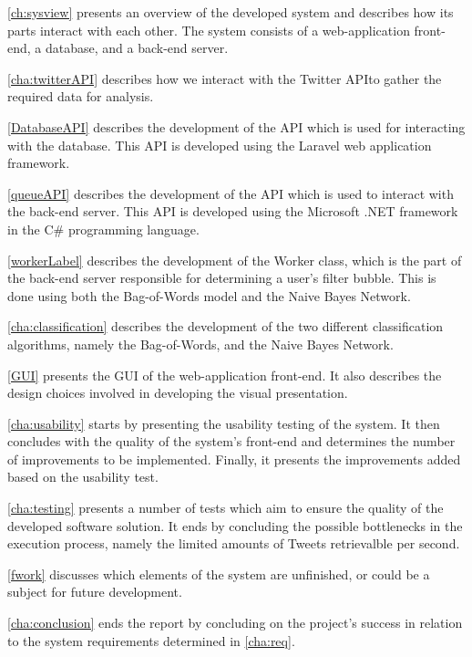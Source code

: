\autoref{ch:sysview} presents an overview of the developed system and describes
how its parts interact with each other. The system consists of a web-application
front-end, a database, and a back-end server.\nl

\autoref{cha:twitterAPI} describes how we interact with the Twitter \ac{API}to
gather the required data for analysis.\nl

\autoref{DatabaseAPI} describes the development of the \ac{API} which is used
for interacting with the database. This \ac{API} is developed using the Laravel
web application framework.\nl

\autoref{queueAPI} describes the development of the \ac{API} which is used to
interact with the back-end server. This \ac{API} is developed using the
Microsoft .NET framework in the C\# programming language.\nl

\autoref{workerLabel} describes the development of the Worker class, which is
the part of the back-end server responsible for determining a user's filter
bubble. This is done using both the Bag-of-Words model and the Naive Bayes
Network.\nl

\autoref{cha:classification} describes the development of the two different
classification algorithms, namely the Bag-of-Words, and the Naive Bayes
Network.\nl

\autoref{GUI} presents the \ac{GUI} of the web-application front-end. It also
describes the design choices involved in developing the visual presentation.\nl

\autoref{cha:usability} starts by presenting the usability testing of the
system. It then concludes with the quality of the system's front-end and
determines the number of improvements to be implemented. Finally, it presents
the improvements added based on the usability test.

\autoref{cha:testing} presents a number of tests which aim to ensure the quality
of the developed software solution. It ends by concluding the possible
bottlenecks in the execution process, namely the limited amounts of Tweets
retrievalble per second.\nl

\autoref{fwork} discusses which elements of the system are unfinished, or could
be a subject for future development.\nl

\autoref{cha:conclusion} ends the report by concluding on the project's success
in relation to the system requirements determined in \autoref{cha:req}.






